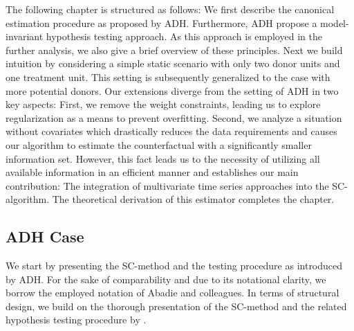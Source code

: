 The following chapter is structured as follows: We first describe the canonical estimation procedure as proposed by \ac{ADH}. Furthermore, \ac{ADH} propose a model-invariant hypothesis testing approach. As this approach is employed in the further analysis, we also give a brief overview of these principles. Next we build intuition by considering a simple static scenario with only two donor units and one treatment unit. This setting is subsequently generalized to the case with more potential donors. Our extensions diverge from the setting of \ac{ADH} in two key aspects: First, we remove the weight constraints, leading us to explore regularization as a means to prevent overfitting. Second, we analyze a situation without covariates which drastically reduces the data requirements and causes our algorithm to estimate the counterfactual with a significantly smaller information set. However, this fact leads us to the necessity of utilizing all available information in an efficient manner and establishes our main contribution: The integration of  multivariate time series approaches into the \ac{SC}-algorithm. The theoretical derivation of this estimator completes the chapter.

\subsection{ADH Case}
\label{ADH Case}
We start by presenting the \ac{SC}-method and the testing procedure as introduced by \ac{ADH}. For the sake of comparability and due to its notational clarity, we borrow the employed notation of Abadie and colleagues. In terms of structural design, we build on the thorough presentation of the \ac{SC}-method and the related hypothesis testing procedure by \cite{firpo:2018}.

